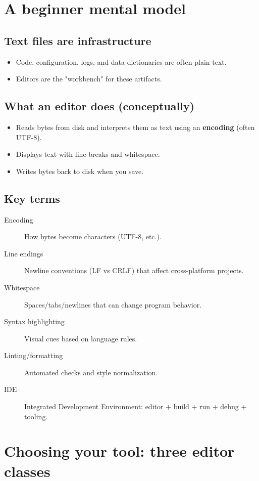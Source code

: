 \section{A beginner mental model}
\subsection{Text files are infrastructure}
\begin{itemize}
\item Code, configuration, logs, and data dictionaries are often plain text.
\item Editors are the "workbench" for these artifacts.
\end{itemize}

\subsection{What an editor does (conceptually)}
\begin{itemize}
\item Reads bytes from disk and interprets them as text using an \textbf{encoding} (often UTF-8).
\item Displays text with line breaks and whitespace.
\item Writes bytes back to disk when you save.
\end{itemize}

\subsection{Key terms}
\begin{description}
\item[Encoding] How bytes become characters (UTF-8, etc.).
\item[Line endings] Newline conventions (LF vs CRLF) that affect cross-platform projects.
\item[Whitespace] Spaces/tabs/newlines that can change program behavior.
\item[Syntax highlighting] Visual cues based on language rules.
\item[Linting/formatting] Automated checks and style normalization.
\item[IDE] Integrated Development Environment: editor + build + run + debug + tooling.
\end{description}

\section{Choosing your tool: three editor classes}
